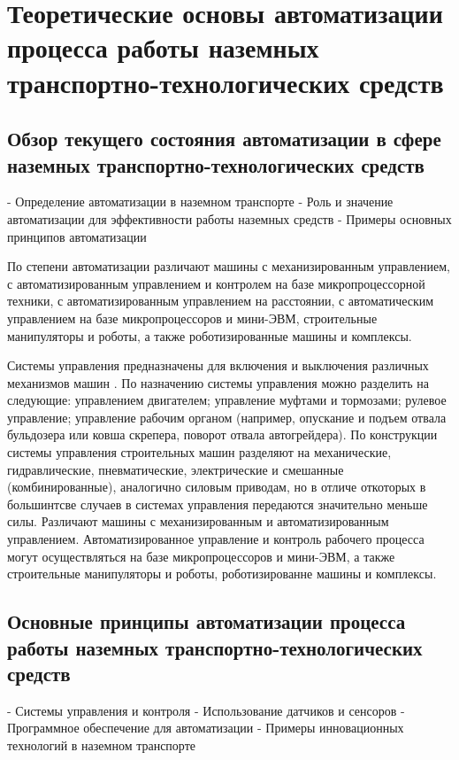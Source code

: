 \chapter{Теоретические основы автоматизации процесса работы наземных транспортно-технологических средств}\label{ch:ch1}

\section{Обзор текущего состояния автоматизации в сфере наземных транспортно-технологических средств}\label{sec:ch1/sec1}

- Определение автоматизации в наземном транспорте
- Роль и значение автоматизации для эффективности работы наземных средств
- Примеры основных принципов автоматизации

По степени автоматизации различают машины с механизированным управлением, с автоматизированным управлением и контролем на базе микропроцессорной техники, с автоматизированным управлением на расстоянии, с автоматическим управлением на базе микропроцессоров и мини-ЭВМ, строительные манипуляторы и роботы, а также роботизированные машины и комплексы. \cite[с.~39]{Evtukov}

Системы управления предназначены для включения и выключения различных механизмов машин \cite[с.~109]{Evtukov}.
По назначению системы управления можно разделить на следующие: управлением двигателем; управление муфтами и тормозами; рулевое управление; управление рабочим органом (например, опускание и подъем отвала бульдозера или ковша скрепера, поворот отвала автогрейдера).
По конструкции системы управления строительных машин разделяют на механические, гидравлические, пневматические, электрические и смешанные (комбинированные), аналогично силовым приводам, но в отличе откоторых в большинтсве случаев в системах управления передаются значительно меньше силы.
Различают машины с механизированным и автоматизированным управлением. Автоматизированное управление и контроль рабочего процесса могут осуществляться на базе микропроцессоров и мини-ЭВМ, а также строительные манипуляторы и роботы, роботизированне машины и комплексы.

\section{Основные принципы автоматизации процесса работы наземных транспортно-технологических средств}\label{sec:ch1/sec2}

- Системы управления и контроля
- Использование датчиков и сенсоров
- Программное обеспечение для автоматизации
- Примеры инновационных технологий в наземном транспорте

